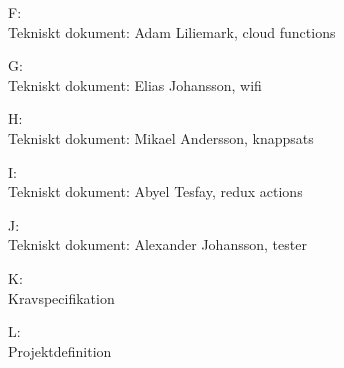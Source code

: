 \documentclass[conference]{IEEEtran}
\begin{document}
\begin{appendix}
    \begin{center}
        \large
        F:\\Tekniskt dokument: Adam Liliemark, cloud functions
    \end{center}

    \clearpage
    
\end{appendix}

\begin{appendix}
    \begin{center}
        \large
        G:\\Tekniskt dokument: Elias Johansson, wifi
    \end{center}

    \clearpage
    
\end{appendix}

\begin{appendix}
    \begin{center}
        \large
        H:\\Tekniskt dokument: Mikael Andersson, knappsats
    \end{center}

    \clearpage
    
\end{appendix}

\begin{appendix}
    \begin{center}
        \large
        I:\\Tekniskt dokument: Abyel Tesfay, redux actions
    \end{center}

    \clearpage
    
\end{appendix}

\begin{appendix}
    \begin{center}
        \large
        J:\\Tekniskt dokument: Alexander Johansson, tester
    \end{center}

    \clearpage
    
\end{appendix}

\begin{appendix}
    \begin{center}
        \large
        K:\\Kravspecifikation
    \end{center}

    \clearpage
    
\end{appendix}

\begin{appendix}
    \begin{center}
        \large
        L:\\Projektdefinition
    \end{center}

    \clearpage
    
\end{appendix}
\end{document}

